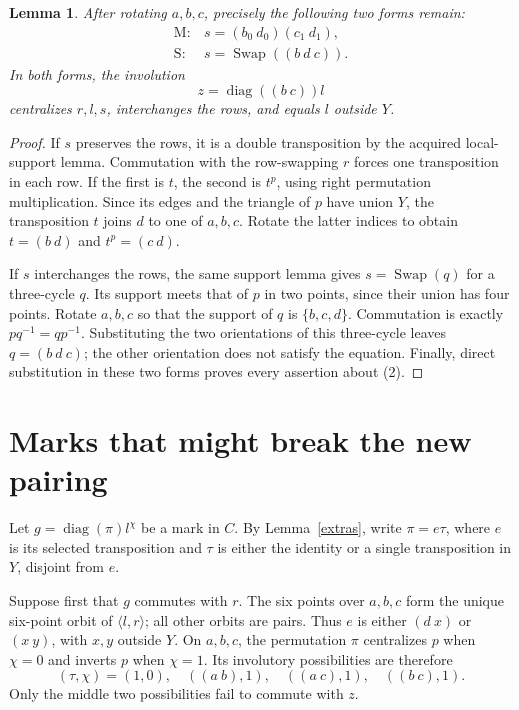 \documentclass[11pt,a4paper]{article}
\newtheorem{lemma}{Lemma}
\newcommand{\gen}[1]{\langle#1\rangle}
\newcommand{\diag}{\operatorname{diag}}
\newcommand{\sw}{\operatorname{Swap}}
\begin{document}
\begin{lemma}\label{forms}
After rotating $a,b,c$, precisely the following two forms remain:
\[
\begin{array}{ll}
 \mathrm M:&s=(b_0\ d_0)(c_1\ d_1),\\[2pt]
 \mathrm S:&s=\sw((b\ d\ c)).
\end{array}                                                   \tag{1}
\]
In both forms, the involution
\[
                       z=\diag((b\ c))l                       \tag{2}
\]
centralizes $r,l,s$, interchanges the rows, and equals $l$
outside $Y$.
\end{lemma}
\begin{proof}
If $s$ preserves the rows, it is a double transposition by the
acquired local-support lemma. Commutation with the row-swapping
$r$ forces one transposition in each row. If the first is $t$,
the second is $t^p$, using right permutation multiplication.
Since its edges and the triangle of $p$ have union $Y$, the
transposition $t$ joins $d$ to one of $a,b,c$. Rotate the latter
indices to obtain $t=(b\ d)$ and $t^p=(c\ d)$.

If $s$ interchanges the rows, the same support lemma gives
$s=\sw(q)$ for a three-cycle $q$. Its support meets that of
$p$ in two points, since their union has four points. Rotate
$a,b,c$ so that the support of $q$ is $\{b,c,d\}$. Commutation
is exactly $pq^{-1}=qp^{-1}$. Substituting the two orientations
of this three-cycle leaves $q=(b\ d\ c)$; the other orientation
does not satisfy the equation. Finally, direct substitution in
these two forms proves every assertion about (2).
\end{proof}

\section*{Marks that might break the new pairing}
Let $g=\diag(\pi)l^\chi$ be a mark in $C$. By
Lemma~\ref{extras}, write $\pi=e\tau$, where $e$ is its
selected transposition and $\tau$ is either the identity or a
single transposition in $Y$, disjoint from $e$.

Suppose first that $g$ commutes with $r$. The six points over
$a,b,c$ form the unique six-point orbit of $\gen{l,r}$; all
other orbits are pairs. Thus $e$ is either $(d\ x)$ or
$(x\ y)$, with $x,y$ outside $Y$. On $a,b,c$, the permutation
$\pi$ centralizes $p$ when $\chi=0$ and inverts $p$ when
$\chi=1$. Its involutory possibilities are therefore
\[
 (\tau,\chi)=(1,0),\quad ((a\ b),1),\quad
              ((a\ c),1),\quad ((b\ c),1).                  \tag{3}
\]
Only the middle two possibilities fail to commute with $z$.
\end{document}
